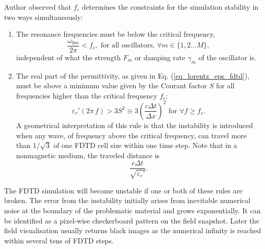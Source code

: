 Author observed that $f_c$ determines the constraints for the simulation stability in two ways simultaneously:
\begin{enumerate}
 \item{The resonance frequencies must be below the critical frequency,  %
\begin{equation} \frac{\omega_{0m}}{2\pi} < f_c, \text{ for all oscillators, } \forall m \in \{1,2 \ldots M\}, \label{eq_fdtd_stability}\end{equation}
independent of what the strength $F_m$ or damping rate $\gamma_m$ of the oscillator is. 
} 
 \item{The real part of the permittivity, as given in Eq. (\ref{eq_lorentz_eps_fdtd}), must be above a minimum value given by the Courant factor $S$ for all frequencies higher than the critical frequency $f_c$:
\begin{equation} \varepsilon_r'(2\pi\,f) > 3 S^{2} \equiv 3 \left( \frac{c \Delta t}{\Delta x} \right)^{2} \text{ for } \forall f \geq f_c. \label{eq_fdtd_stability_realp}\end{equation}  } %
A geometrical interpretation of this rule is that the instability is introduced when any wave, of frequency above the critical frequency, can travel more than $1/\sqrt{3}$ of one FDTD cell size within one time step. 
Note that in a nonmagnetic medium, the traveled distance is $$\frac{c\Delta t}{\sqrt{\varepsilon_r'}}.$$
\end{enumerate}
The FDTD simulation will become unstable if one or both of these rules are broken. The error from the instability initially arises from inevitable numerical noise at the boundary of the problematic material and grows exponentially. It can be identified as a pixel-wise checkerboard pattern on the field snapshot. Later the field visualisation usually returns black images as the numerical infinity is reached within several tens of FDTD steps. 

